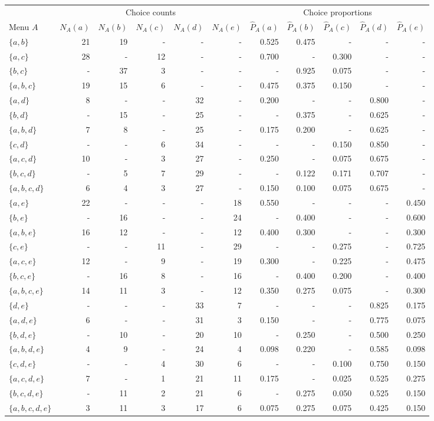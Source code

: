 
\begin{tabular}{lrrrrrrrrrr}
\toprule
\multicolumn{1}{c}{ } & \multicolumn{5}{c}{Choice counts} & \multicolumn{5}{c}{Choice proportions} \\
\cmidrule(l{3pt}r{3pt}){2-6} \cmidrule(l{3pt}r{3pt}){7-11}
Menu $A$ & $N_A(a)$ & $N_A(b)$ & $N_A(c)$ & $N_A(d)$ & $N_A(e)$ & $\hat P_A(a)$ & $\hat P_A(b)$ & $\hat P_A(c)$ & $\hat P_A(d)$ & $\hat P_A(e)$\\
\midrule
$\{a,b\}$ & 21 & 19 & - & - & - & 0.525 & 0.475 & - & - & -\\
$\{a,c\}$ & 28 & - & 12 & - & - & 0.700 & - & 0.300 & - & -\\
$\{b,c\}$ & - & 37 & 3 & - & - & - & 0.925 & 0.075 & - & -\\
$\{a,b,c\}$ & 19 & 15 & 6 & - & - & 0.475 & 0.375 & 0.150 & - & -\\
$\{a,d\}$ & 8 & - & - & 32 & - & 0.200 & - & - & 0.800 & -\\
\addlinespace
$\{b,d\}$ & - & 15 & - & 25 & - & - & 0.375 & - & 0.625 & -\\
$\{a,b,d\}$ & 7 & 8 & - & 25 & - & 0.175 & 0.200 & - & 0.625 & -\\
$\{c,d\}$ & - & - & 6 & 34 & - & - & - & 0.150 & 0.850 & -\\
$\{a,c,d\}$ & 10 & - & 3 & 27 & - & 0.250 & - & 0.075 & 0.675 & -\\
$\{b,c,d\}$ & - & 5 & 7 & 29 & - & - & 0.122 & 0.171 & 0.707 & -\\
\addlinespace
$\{a,b,c,d\}$ & 6 & 4 & 3 & 27 & - & 0.150 & 0.100 & 0.075 & 0.675 & -\\
$\{a,e\}$ & 22 & - & - & - & 18 & 0.550 & - & - & - & 0.450\\
$\{b,e\}$ & - & 16 & - & - & 24 & - & 0.400 & - & - & 0.600\\
$\{a,b,e\}$ & 16 & 12 & - & - & 12 & 0.400 & 0.300 & - & - & 0.300\\
$\{c,e\}$ & - & - & 11 & - & 29 & - & - & 0.275 & - & 0.725\\
\addlinespace
$\{a,c,e\}$ & 12 & - & 9 & - & 19 & 0.300 & - & 0.225 & - & 0.475\\
$\{b,c,e\}$ & - & 16 & 8 & - & 16 & - & 0.400 & 0.200 & - & 0.400\\
$\{a,b,c,e\}$ & 14 & 11 & 3 & - & 12 & 0.350 & 0.275 & 0.075 & - & 0.300\\
$\{d,e\}$ & - & - & - & 33 & 7 & - & - & - & 0.825 & 0.175\\
$\{a,d,e\}$ & 6 & - & - & 31 & 3 & 0.150 & - & - & 0.775 & 0.075\\
\addlinespace
$\{b,d,e\}$ & - & 10 & - & 20 & 10 & - & 0.250 & - & 0.500 & 0.250\\
$\{a,b,d,e\}$ & 4 & 9 & - & 24 & 4 & 0.098 & 0.220 & - & 0.585 & 0.098\\
$\{c,d,e\}$ & - & - & 4 & 30 & 6 & - & - & 0.100 & 0.750 & 0.150\\
$\{a,c,d,e\}$ & 7 & - & 1 & 21 & 11 & 0.175 & - & 0.025 & 0.525 & 0.275\\
$\{b,c,d,e\}$ & - & 11 & 2 & 21 & 6 & - & 0.275 & 0.050 & 0.525 & 0.150\\
\addlinespace
$\{a,b,c,d,e\}$ & 3 & 11 & 3 & 17 & 6 & 0.075 & 0.275 & 0.075 & 0.425 & 0.150\\
\bottomrule
\end{tabular}
